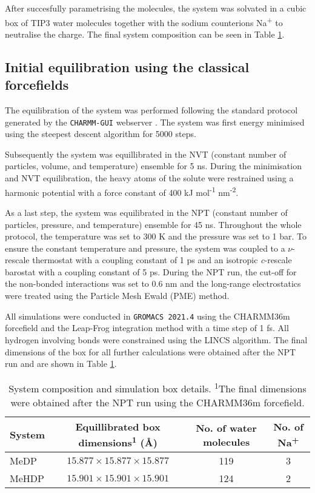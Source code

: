 After succesfully parametrising the molecules, the system was solvated in a cubic box of TIP3 water molecules together with the sodium counterions Na\textsuperscript{+} to neutralise the charge. The final system composition can be seen in Table \ref{tab:system-before-equilibration}.

\subsection{Initial equilibration using the classical forcefields}
The equilibration of the system was performed following the standard protocol generated by the \texttt{CHARMM-GUI} webserver \citep{jo_charmm-gui_2008}. The system was first energy minimised using the steepest descent algorithm for 5000 steps. 

Subsequently the system was equillibrated in the NVT (constant number of particles, volume, and temperature) ensemble for 5 ns. During the minimisation and NVT equilibration, the heavy atoms of the solute were restrained using a harmonic potential with a force constant of 400 kJ mol\textsuperscript{-1} nm\textsuperscript{-2}.

As a last step, the system was equilibrated in the NPT (constant number of particles, pressure, and temperature) ensemble for 45 ns. Throughout the whole protocol, the temperature was set to 300 K and the pressure was set to 1 bar. To ensure the constant temperature and pressure, the system was coupled to a $\nu$-rescale thermostat with a coupling constant of 1 ps and an isotropic \textit{c}-rescale barostat with a coupling constant of 5 ps. During the NPT run, the cut-off for the non-bonded interactions was set to 0.6 nm and the long-range electrostatics were treated using the Particle Mesh Ewald (PME) method.

All simulations were conducted in \texttt{GROMACS 2021.4} \citep{abraham_gromacs_2015} using the CHARMM36m forcefield \citep{huang_charmm36m_2017} and the Leap-Frog integration method with a time step of 1 fs. All hydrogen involving bonds were constrained using the LINCS algorithm. The final dimensions of the box for all further calculations were obtained after the NPT run and are shown in Table \ref{tab:system-before-equilibration}.
\begin{table}[htbp]
    \centering
    \caption{System composition and simulation box details. \textsuperscript{1}The final dimensions were obtained after the NPT run using the CHARMM36m forcefield.}
    \label{tab:system-before-equilibration}
    \begin{tabular}{@{}lccc@{}}
    \toprule
    System & Equillibrated box dimensions\textsuperscript{1} (\AA) & No. of water molecules & No. of Na\textsuperscript{+} \\
    \midrule
    MeDP  & $15.877 \times 15.877 \times 15.877$ & 119 & 3 \\
    MeHDP & $15.901 \times 15.901 \times 15.901$ & 124 & 2 \\
    \bottomrule
    \end{tabular}
\end{table}
